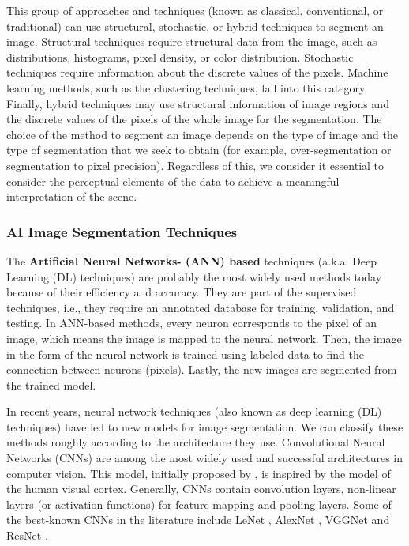 This group of approaches and techniques (known as classical, conventional, or traditional) can use structural, stochastic, or hybrid techniques to segment an image. Structural techniques require structural data from the image, such as distributions, histograms, pixel density, or color distribution. Stochastic techniques require information about the discrete values of the pixels. Machine learning methods, such as the clustering techniques, fall into this category. Finally, hybrid techniques may use structural information of image regions and the discrete values of the pixels of the whole image for the segmentation. The choice of the method to segment an image depends on the type of image and the type of segmentation that we seek to obtain (for example, over-segmentation or segmentation to pixel precision). Regardless of this, we consider it essential to consider the perceptual elements of the data to achieve a meaningful interpretation of the scene.

\subsubsection*{AI Image Segmentation Techniques} 
The \textbf{Artificial Neural Networks- (ANN) based} techniques (a.k.a. Deep Learning (DL) techniques) are probably the most widely used methods today because of their efficiency and accuracy. They are part of the supervised techniques, i.e., they require an annotated database for training, validation, and testing. In ANN-based methods, every neuron corresponds to the pixel of an image, which means the image is mapped to the neural network. Then, the image in the form of the neural network is trained using labeled data to find the connection between neurons (pixels). Lastly, the new images are segmented from the trained model. 

In recent years, neural network techniques (also known as deep learning (DL) techniques) have led to new models for image segmentation. We can classify these methods roughly according to the architecture they use. Convolutional Neural Networks  (CNNs) are among the most widely used and successful architectures in computer vision. This model, initially proposed by \cite{Fukushima:BC:1980}, is inspired by the model of the human visual cortex. Generally, CNNs contain convolution layers, non-linear layers (or activation functions) for feature mapping and pooling layers. Some of the best-known CNNs in the literature include LeNet \citep{Lecun.Bottou.ea::1998}, AlexNet \citep{Krizhevsky.Sutskever.ea:NIPS:2012}, VGGNet \citep{Simonyan.Zisserman:arXiv:2015} and ResNet \citep{He.Zhang.ea:ICVPR:2016}. 

